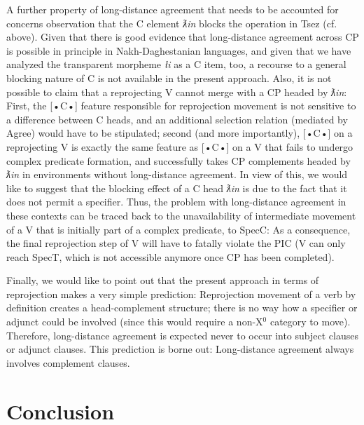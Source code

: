 \documentclass[output=paper
,modfonts
,nonflat]{langsci/langscibook}
\begin{document}
	 A further property of long-distance agreement that needs to be
	accounted for concerns  observation
	that the C element {\itshape ƛin} blocks the operation in Tsez
	(cf.  above). Given that there is good evidence that
	long-distance agreement across CP is possible in principle in
	Nakh-Daghestanian languages, and given that we have analyzed the
	transparent morpheme {\itshape {\l}i} as a C item, too, a recourse to a
	general blocking nature of C is not available in the present
	approach. Also, it is not possible to claim that a reprojecting V
	cannot merge with a CP headed by {\itshape ƛin}: First, the
	[•C•] feature responsible for
	reprojection movement is not sensitive to a difference between C
	heads, and an additional selection relation (mediated by Agree) would
	have to be stipulated; second (and more importantly), [•C•] 
	on a reprojecting V is exactly the same feature as [•C•] on a V that
	fails to undergo complex predicate formation, and successfully takes
	CP complements headed by {\itshape ƛin} in environments
	without long-distance agreement. In view of this, we would like to
	suggest that the blocking effect of a C head {\itshape ƛin} is
	due to the fact that it does not permit a specifier. Thus, the problem
	with long-distance agreement in these contexts can be traced back to
	the unavailability of intermediate movement of a V that is initially
	part of a complex predicate, to SpecC: As a consequence, the final
	reprojection step of V will have to fatally violate the PIC (V
	can only reach SpecT, which is not accessible anymore once CP has been
	completed).
	
	Finally, we would like to point out that the present approach in terms
	of reprojection makes a very simple prediction: Reprojection movement
	of a verb by definition creates a head-complement structure; there is
	no way how a specifier or adjunct could be involved (since this would
	require a non-X$^0$ category to move). Therefore, long-distance
	agreement is expected never to occur into subject clauses or adjunct
	clauses.  This prediction is borne out: Long-distance agreement always
	involves complement clauses.
	
	
	\section{Conclusion} \label{sec-bjoe-muel:4}
	
\end{document}
